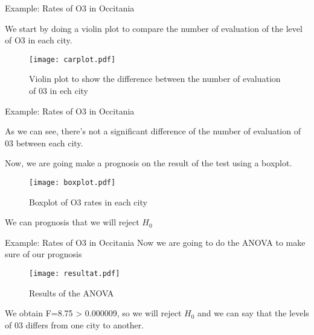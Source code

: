 \documentclass[unknownkeysallowed]{beamer}
\begin{document}
\begin{frame}{Example: Rates of O3 in Occitania}

We start by doing a violin plot to compare the number of evaluation of the level of O3 in each city. 
\begin{figure}
    \centering
    \texttt{[image: carplot.pdf]}
    \caption{Violin plot to show the difference between the number of evaluation of 03 in ech city}
    \label{fig:my_label}
\end{figure}
\end{frame}

\begin{frame}{Example: Rates of O3 in Occitania}

As we can see, there's not a significant difference of the number of evaluation of 03 between each city.

Now, we are going make a prognosis on the result of the test using a boxplot.

\begin{figure}
    \centering
    \texttt{[image: boxplot.pdf]}
    \caption{ Boxplot of O3 rates in each city}
    \label{fig:my_label}
\end{figure}
 
 We can prognosis that we will reject $H_0$   
\end{frame}

\begin{frame}{Example: Rates of O3 in Occitania}
Now we are going to do the ANOVA to make sure of our prognosis
\begin{figure}
    \centering
    \texttt{[image: resultat.pdf]}
    \caption{Results of the ANOVA}
    \label{fig:my_label}
\end{figure}
We obtain F=8.75 > 0.000009, so we will reject $H_0$ and we can say that the levels of 03 differs from one city to another.
\end{frame}
\end{document}
